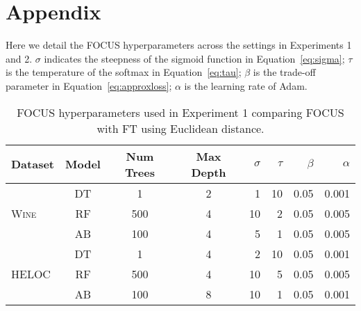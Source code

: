 
\section*{Appendix}
\label{section:hyperparameters}
Here we detail the FOCUS hyperparameters across the  settings in Experiments 1 and 2. $\sigma$ indicates the steepness of the sigmoid function in Equation~\ref{eq:sigma}; $\tau$ is the temperature of the softmax in Equation~\ref{eq:tau}; $\beta$ is the trade-off parameter in Equation~\ref{eq:approxloss}; $\alpha$ is the learning rate of Adam. 

\begin{table}[h]
\centering
\caption{FOCUS hyperparameters used in Experiment 1 comparing FOCUS with FT using Euclidean distance.}
\label{table:hyperparameters-euc}
\begin{tabular}{lcccrrrr}
\toprule
\textbf{Dataset}                   & \textbf{Model}       & \textbf{Num Trees}   & \textbf{Max Depth}   & $\sigma$ & $\tau$ & $\beta$ & $\alpha$ \\ \midrule
	                 & DT                   & 1                                  & 2                                  & 1  & 10 & 0.05 & 0.001    	 \\
\textsc{Wine}                   & RF                   & 500                                & 4                                  & 10 & 2  & 0.05 & 0.005      	 \\
\textsc{}                          & AB                   & 100                                & 4                                  & 5  & 1  & 0.05 & 0.005      	 \\ \midrule
\multirow{3}{*}{\textsc{HELOC}}    & DT                   & 1                                  & 4                                  & 2  & 10 & 0.05 & 0.001	    \\
                                   & RF                   & 500                                & 4                                  & 10 & 5  & 0.05 & 0.005      	\\
                                   & AB                   & 100                                & 8                                  & 10 & 1  & 0.05 & 0.001  	   \\ \midrule

\end{tabular}
\end{table}
